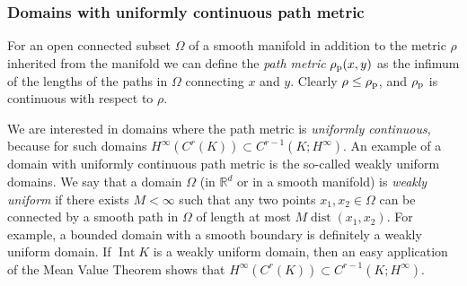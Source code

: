 \documentclass[12pt]{amsart}
\begin{document}
{\begin{list}{X}
{\subsubsection{Domains with uniformly continuous path metric}
\label{s:PathMetrUinfCont}
For an open connected subset $\Omega$ of a smooth manifold in addition to the metric $\rho$ inherited from the manifold we can define the \emph{path metric} $\rho{_{\scriptstyle \text{\rm p}}}(x,y)$ as the infimum of the lengths of the paths in $\Omega$ connecting $x$ and $y$. Clearly $\rho\le \rho{_{\scriptstyle \text{\rm p}}}$, and $\rho{_{\scriptstyle \text{\rm p}}}$ is continuous with respect to $\rho$. 

We are interested in domains where the path metric is \emph{uniformly continuous}, because   for such domains 
$ H^\infty\left(C^r(K)\right)\subset C^{r-1}\left(K;H^\infty\right)$.   An example of a domain with uniformly continuous path metric is the so-called weakly uniform domains. 
We say that a domain $\Omega$ (in ${\mathbb{R}}^d$ or in a smooth manifold) is \emph{weakly uniform}  if there exists $M<\infty$ such that  any two points $x_1, x_2\in \Omega$ can be connected by a smooth path in $\Omega$ of length at most $M{\operatorname{dist}}(x_1, x_2)$. 
For example, a bounded domain with a smooth boundary is definitely a weakly uniform domain.  If ${\operatorname{Int}} K$ is a weakly uniform domain, then an easy application of the Mean Value Theorem shows that $ H^\infty\left(C^r(K)\right)\subset C^{r-1}\left(K;H^\infty\right)$. 

}
\end{list}}
\end{document}
